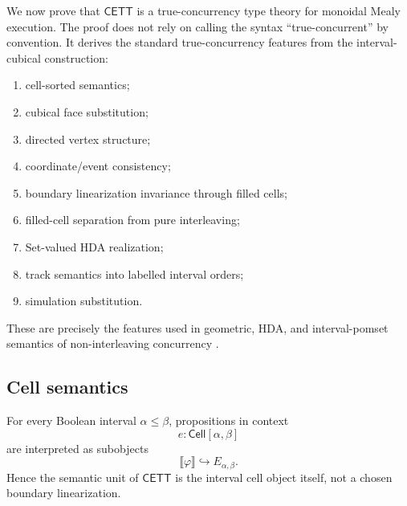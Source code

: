 We now prove that \(\mathsf{CETT}\) is a true-concurrency type theory for
monoidal Mealy execution. The proof does not rely on calling the syntax
``true-concurrent'' by convention. It derives the standard true-concurrency
features from the interval-cubical construction:

\begin{enumerate}
    \item cell-sorted semantics;
    \item cubical face substitution;
    \item directed vertex structure;
    \item coordinate/event consistency;
    \item boundary linearization invariance through filled cells;
    \item filled-cell separation from pure interleaving;
    \item Set-valued HDA realization;
    \item track semantics into labelled interval orders;
    \item simulation substitution.
\end{enumerate}

These are precisely the features used in geometric, HDA, and interval-pomset
semantics of non-interleaving concurrency
\cite{NielsenPlotkinWinskel1981,Pratt1991,Pratt2000,vanGlabbeek2006,FajstrupGoubaultRaussen2006,FahrenbergJohansenStruthZiemianski2021,Fahrenberg_2024,AmraneBazilleFahrenbergFortin2024}.

\subsection{Cell semantics}
\label{subsec:cmett-cell-semantics}

\begin{proposition}
\label{prop:cmett-cell-semantics}
    For every Boolean interval \(\alpha\leq\beta\), propositions in context
    \[
        e:\mathsf{Cell}[\alpha,\beta]
    \]
    are interpreted as subobjects
    \[
        \llbracket\varphi\rrbracket\hookrightarrow E_{\alpha,\beta}.
    \]
    Hence the semantic unit of \(\mathsf{CETT}\) is the interval cell object
    itself, not a chosen boundary linearization.
\end{proposition}

